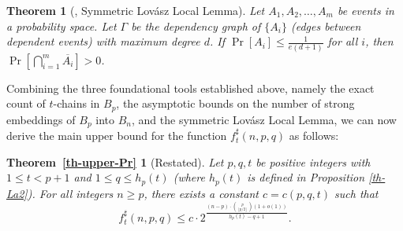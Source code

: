 \documentclass[twoside,12pt]{article}
\newtheorem{theorem}{Theorem}[section]
\begin{document}
\begin{theorem}[\cite{Sp77}, Symmetric Lov\'asz Local Lemma]\label{th-LLL-SV}
Let \(A_1, A_2, \dots, A_m\) be events in a probability space. Let \(\Gamma\) be the dependency graph of \(\{A_i\}\) (edges between dependent events) with maximum degree \(d\). If \(\Pr[A_i] \leq \frac{1}{e(d + 1)}\) for all \(i\), then \(\Pr\left[\bigcap_{i=1}^m \overline{A_i}\right] > 0\).
\end{theorem}

Combining the three foundational tools established above, namely the exact count of \(t\)-chains in \(B_p\), the asymptotic bounds on the number of strong embeddings of \(B_p\) into \(B_n\), and the symmetric Lov\'asz Local Lemma, we can now derive the main upper bound for the function \(f_t^{\sharp}(n, p, q)\) as follows:
\newtheorem*{mainthm1}{\rm\bf Theorem~\ref{th-upper-Pr}}
\begin{mainthm1}[Restated]
Let \(p, q, t\) be positive integers with $1 \leq t< p+1$ and $1 \leq q \leq h_p(t)$ (where \(h_p(t)\) is defined in Proposition \ref{th-La2}). For all integers \(n \geq p\), there exists a constant \(c = c(p, q, t)\) such that
\begin{equation*}
f_t^{\sharp}(n, p, q) \leq c \cdot 2^{\frac{(n - p) \cdot \binom{p}{\lfloor p/2 \rfloor}(1+o(1))}{h_p(t) - q + 1}}.
\end{equation*}
\end{mainthm1}
\end{document}
